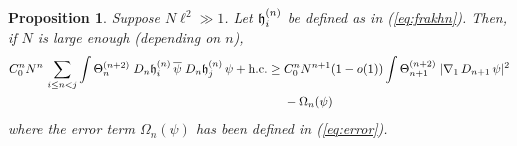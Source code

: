 \documentclass[11pt]{article}
\newtheorem{proposition}[theorem]{Proposition}
\newcommand{\fh}{{\frak h}}
\begin{document}
\begin{proposition}\label{lm:Hk-2}
Suppose $N \ell^2 \gg 1$. Let $\fh^{(n)}_i$ be defined as in
(\ref{eq:frakhn}). Then, if $N$ is large enough (depending on $n$),
\begin{equation}\label{eq:lmHk-2}
\begin{split}
C_0^n N^n \, \sum_{i\leq n < j} \int \Theta^{(n+2)}_n \; D_n
\fh^{(n)}_i \, \overline{\psi} \; D_n \fh^{(n)}_j \, \psi
+\text{h.c.} \geq  \; & C_0^n N^{n+1} (1-o(1)) \int
\Theta^{(n+2)}_{n+1} \; |\nabla_1 \, D_{n+1} \,\psi|^2  \\ & -
\Omega_n (\psi)
\end{split}
\end{equation}
where the error term $\Omega_n (\psi)$ has been defined in
(\ref{eq:error}).
\end{proposition}
\end{document}
